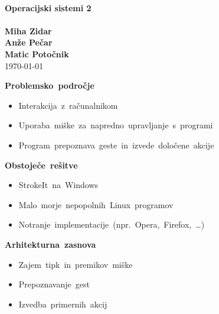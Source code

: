 \documentclass[10pt,landscape,a4paper,oneside]{article}
\newenvironment{items}{
\begin{itemize}
	\setlength{\itemsep}{2pt}
	\setlength{\parskip}{0pt}
	\setlength{\parsep}{0pt}
	\setlength{\topsep}{0pt}
}{\end{itemize}}
\begin{document}
\begin{titlepage}
\begin{center}
\ \\[1cm]
{\Huge\bf Operacijski sistemi 2}\\[1cm]
{}\\[2cm]
{\Large\bf Miha Zidar}\\[0.5cm]
{\Large\bf Anže Pečar}\\[0.5cm]
{\Large\bf Matic Potočnik}\\[2cm]

{\huge \today}\ \\[1.55cm]

\end{center}
\end{titlepage}
\pagebreak
\begin{center}
	\Huge\mbox{\bf Problemsko področje}\\[2cm]
	\begin{items}
	\item \mbox{Interakcija z računalnikom}
	\item \mbox{Uporaba miške za napredno upravljanje s programi}
	\item \mbox{Program prepoznava geste in izvede določene akcije}
	\end{items}
\end{center}
\pagebreak
\begin{center}
	\Huge\mbox{\bf Obstoječe rešitve}\\[2cm]
	\begin{items}
	\item \mbox{StrokeIt na Windows}
	\item \mbox{Malo morje nepopolnih Linux programov}
	\item \mbox{Notranje implementacije (npr. Opera, Firefox, \dots)}
	\end{items}
\end{center}
\pagebreak
\begin{center}
	\Huge\mbox{\bf Arhitekturna zasnova}\\[2cm]
	\begin{items}
	\item \mbox{Zajem tipk in premikov miške}
	\item \mbox{Prepoznavanje gest}
	\item \mbox{Izvedba primernih akcij}
	\end{items}
\end{center}
\pagebreak
\end{document}
